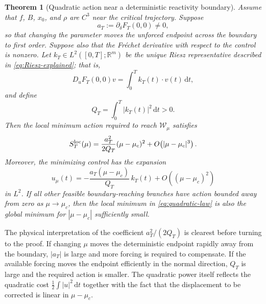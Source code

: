 \documentclass[11pt]{article}
\newtheorem{theorem}{Theorem}[section]
\theoremstyle{definition}
\theoremstyle{remark}
\newcommand{\R}{\mathbb{R}}
\newcommand{\dd}{\mathrm{d}}
\begin{document}
\begin{theorem}[Quadratic action near a deterministic reactivity boundary]
\label{thm:quadratic-switching}
Assume that $f$, $B$, $x_0$, and $\rho$ are $C^3$ near the critical trajectory.  Suppose
\begin{equation}
a_T:=\partial_\delta F_T(0,0)\ne0,
\label{eq:aT-def}
\end{equation}
so that changing the parameter moves the unforced endpoint across the boundary to first order.  Suppose also that the Fr\'echet derivative with respect to the control is nonzero.  Let $k_T\in L^2([0,T];\R^m)$ be the unique Riesz representative described in \eqref{eq:Riesz-explained}; that is,
\begin{equation}
D_uF_T(0,0)v
=\int_0^T k_T(t)\cdot v(t)\,\dd t,
\label{eq:Riesz-kernel}
\end{equation}
and define
\begin{equation}
Q_T=\int_0^T |k_T(t)|^2\,\dd t>0.
\label{eq:QT-def}
\end{equation}
Then the local minimum action required to reach $\mathcal W_\mu$ satisfies
\begin{equation}
S_T^{\rm loc}(\mu)
=\frac{a_T^2}{2Q_T}(\mu-\mu_c)^2
+O\!\left(|\mu-\mu_c|^3\right).
\label{eq:quadratic-law}
\end{equation}
Moreover, the minimizing control has the expansion
\begin{equation}
u_\mu(t)
=-\frac{a_T(\mu-\mu_c)}{Q_T}\,k_T(t)
+O\!\left((\mu-\mu_c)^2\right)
\label{eq:optimal-control-leading}
\end{equation}
in $L^2$.  If all other feasible boundary-reaching branches have action bounded away from zero as $\mu\to\mu_c$, then the local minimum in \eqref{eq:quadratic-law} is also the global minimum for $|\mu-\mu_c|$ sufficiently small.
\end{theorem}

The physical interpretation of the coefficient $a_T^2/(2Q_T)$ is clearest before turning to the proof.  If changing $\mu$ moves the deterministic endpoint rapidly away from the boundary, $|a_T|$ is large and more forcing is required to compensate.  If the available forcing moves the endpoint efficiently in the normal direction, $Q_T$ is large and the required action is smaller.  The quadratic power itself reflects the quadratic cost $\frac12\int|u|^2\,\dd t$ together with the fact that the displacement to be corrected is linear in $\mu-\mu_c$.
\end{document}
